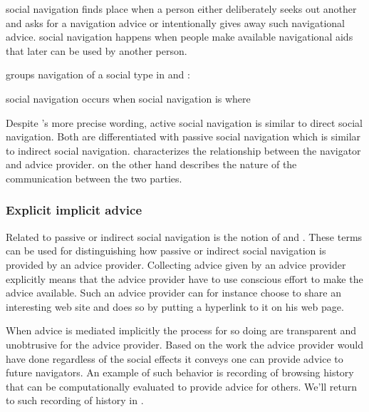 \begin{items}
   social navigation finds place when a person either
    deliberately seeks out another and asks for a navigation advice or
    intentionally gives away such navigational advice.
   social navigation happens when people make available
    navigational aids that later can be used by another person.
\end{items}

\citeauthor{svensson03} groups navigation of a social type in
 and :

\begin{items}
   social navigation occurs when
   social navigation is where
\end{items}

Despite \citeauthor{svensson03}'s more precise wording, active social
navigation is similar to direct social navigation. Both are differentiated
with passive social navigation which is similar to indirect social navigation.
\citeauthor{dieberger97} characterizes the relationship between the
navigator and advice provider. \citeauthor{svensson03} on the other hand
describes the nature of the communication between the two parties.

\subsubsection{Explicit \oldand implicit advice}
\label{section:social.navigation.fundamental.categorization.explicit.implicit}

Related to passive or indirect social navigation is the notion
of  and .
These terms can be used for distinguishing how
passive or indirect social navigation is provided by an advice provider.
Collecting advice given by an advice provider explicitly means that
the advice provider have to use conscious effort to make the advice available.
Such an advice provider can for instance choose to share an interesting web
site and does so by putting a hyperlink to it on his web page.

When advice is mediated implicitly the process for so doing are transparent
and unobtrusive for the advice provider. Based on the work the advice provider
would have done regardless of the social effects it conveys one can provide
advice to future navigators. An example of such behavior is recording of
browsing history that can be computationally evaluated to provide advice for
others. We'll return to such recording of history in
.

